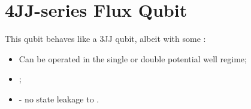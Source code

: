 \newpage
\section{4JJ-series Flux Qubit \cite{qui2016}}
\begin{framed}\noindent
  This   qubit   behaves  like   a   3JJ   qubit,  albeit   with   some
  :
  \begin{itemize}
  \item Can be operated in the single or double potential well regime;
  \item {};
  \item      {} - no state leakage to .
  \end{itemize}
\end{framed}

\noindent
